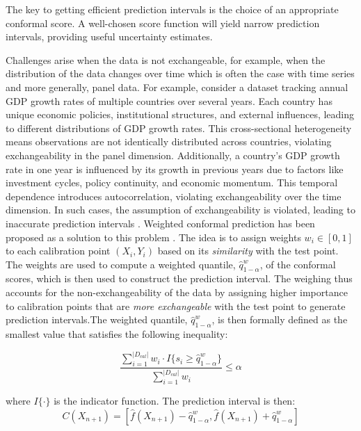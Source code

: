 The key to getting efficient prediction intervals is the choice of an appropriate conformal score. A well-chosen score function will yield narrow prediction intervals, providing useful uncertainty estimates.

Challenges arise when the data is not exchangeable, for example, when the distribution of the data changes over time which is often the case with time series and more generally, panel data. For example, consider a dataset tracking annual GDP growth rates of multiple countries over several years. Each country has unique economic policies, institutional structures, and external influences, leading to different distributions of GDP growth rates. This cross-sectional heterogeneity means observations are not identically distributed across countries, violating exchangeability in the panel dimension. Additionally, a country's GDP growth rate in one year is influenced by its growth in previous years due to factors like investment cycles, policy continuity, and economic momentum. This temporal dependence introduces autocorrelation, violating exchangeability over the time dimension. In such cases, the assumption of exchangeability is violated, leading to inaccurate prediction intervals \cite{barber2022conformal, oliveira2022split}. Weighted conformal prediction has been proposed as a solution to this problem \cite{barber2022conformal}. The idea is to assign weights $w_i \in [0, 1]$ to each calibration point $(X_i, Y_i)$ based on its \textit{similarity} with the test point. The weights are used to compute a weighted quantile, $\hat{q}^w_{1-\alpha}$, of the conformal scores, which is then used to construct the prediction interval. The weighing thus accounts for the non-exchangeability of the data by assigning higher importance to calibration points that are \textit{more exchangeable} with the test point to generate prediction intervals.The weighted quantile, $\hat{q}^w_{1-\alpha}$, is then formally defined as the smallest value that satisfies the following inequality:

\begin{equation}
\frac{\sum_{i=1}^{|D_{cal}|} w_i \cdot I\{s_i \geq \hat{q}^w_{1-\alpha}\}}{\sum_{i=1}^{|D_{cal}|} w_i} \leq \alpha
\end{equation}

where $I\{\cdot\}$ is the indicator function. The prediction interval is then:
$$C(X_{n+1}) = [\hat{f}(X_{n+1}) - \hat{q}^w_{1-\alpha}, \hat{f}(X_{n+1}) + \hat{q}^w_{1-\alpha}]$$

